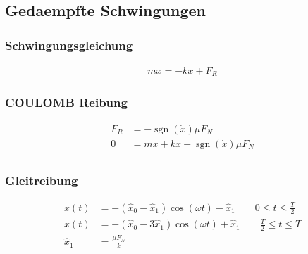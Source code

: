\subsection{Gedaempfte Schwingungen}

\begin{multicols}{2}{}
\subsubsection{Schwingungsgleichung}
\begin{align*}
m\ddot{x}=-kx+F_R
\end{align*}
\hfill

\subsubsection{COULOMB Reibung}
\begin{align*}
F_R&=-\operatorname{sgn}({\dot{x}})\mu F_N\\
0&=m\ddot{x}+kx+\operatorname{sgn}({\dot{x}})\mu F_N\\
\end{align*}
\end{multicols}


\subsubsection{Gleitreibung}
\begin{align*}
x(t)&=-(\hat{x}_0-\hat{x}_1)\cos(\omega t)-\hat{x}_1\qquad 0\leq t\leq \frac{T}{2}\\
x(t)&=-(\hat{x}_0-3\hat{x}_1)\cos(\omega t)+\hat{x}_1\qquad \frac{T}{2}\leq t\leq T\\
\hat{x}_1&=\frac{\mu F_N}{k}
\end{align*}



